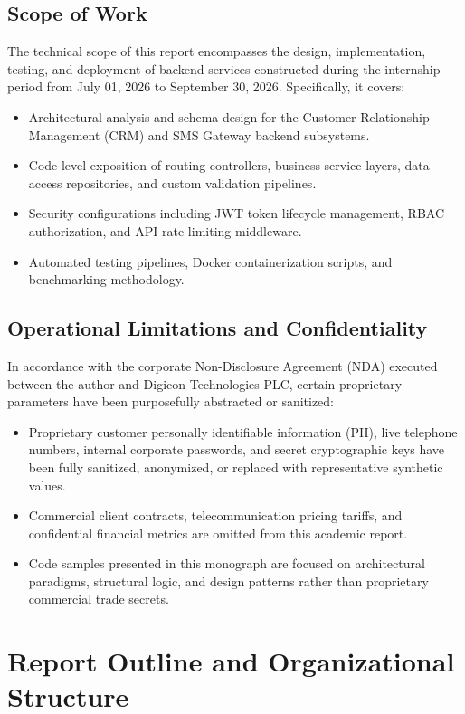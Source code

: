 \subsection{Scope of Work}
The technical scope of this report encompasses the design, implementation, testing, and deployment of backend services constructed during the internship period from July 01, 2026 to September 30, 2026. Specifically, it covers:
\begin{itemize}
    \item Architectural analysis and schema design for the Customer Relationship Management (CRM) and SMS Gateway backend subsystems.
    \item Code-level exposition of routing controllers, business service layers, data access repositories, and custom validation pipelines.
    \item Security configurations including JWT token lifecycle management, RBAC authorization, and API rate-limiting middleware.
    \item Automated testing pipelines, Docker containerization scripts, and benchmarking methodology.
\end{itemize}

\subsection{Operational Limitations and Confidentiality}
In accordance with the corporate Non-Disclosure Agreement (NDA) executed between the author and Digicon Technologies PLC, certain proprietary parameters have been purposefully abstracted or sanitized:
\begin{itemize}
    \item Proprietary customer personally identifiable information (PII), live telephone numbers, internal corporate passwords, and secret cryptographic keys have been fully sanitized, anonymized, or replaced with representative synthetic values.
    \item Commercial client contracts, telecommunication pricing tariffs, and confidential financial metrics are omitted from this academic report.
    \item Code samples presented in this monograph are focused on architectural paradigms, structural logic, and design patterns rather than proprietary commercial trade secrets.
\end{itemize}

\section{Report Outline and Organizational Structure}
\label{sec:intro_organization}

